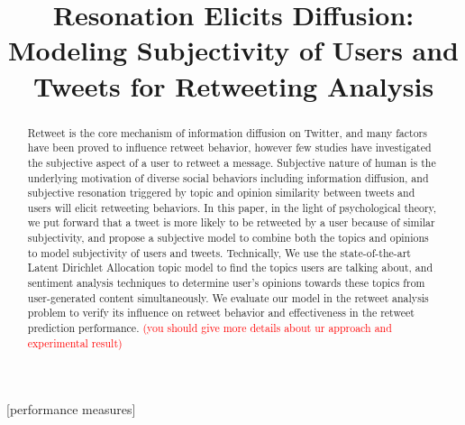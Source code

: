 \documentclass{acm_proc_article-sp}
\newcommand{\mo}[1]{\textcolor{red}{#1}}
\begin{document}
\title{Resonation Elicits Diffusion: Modeling Subjectivity of Users and Tweets for Retweeting Analysis}

\maketitle
\begin{abstract}
Retweet is the core mechanism of information diffusion on Twitter, and many factors have been proved to influence retweet behavior, however few studies have investigated the subjective aspect of a user to retweet a message. Subjective nature of human is the underlying motivation of diverse social behaviors including information diffusion, and subjective resonation triggered by topic and opinion similarity between tweets and users will elicit retweeting behaviors.
In this paper, in the light of psychological theory, we put forward that a tweet is more likely to be retweeted by a user because of similar subjectivity, and propose a subjective model to combine both the topics and opinions to model subjectivity of users and tweets. Technically, We use the state-of-the-art Latent Dirichlet Allocation topic model to find the topics users are talking about, and sentiment analysis techniques to determine user's opinions towards these topics from user-generated content simultaneously. 
We evaluate our model in the retweet analysis problem to verify its influence on retweet behavior and effectiveness in the retweet prediction performance. \mo{(you should  give more details about ur approach and experimental result)}
\end{abstract}

[performance measures]


\end{document}
